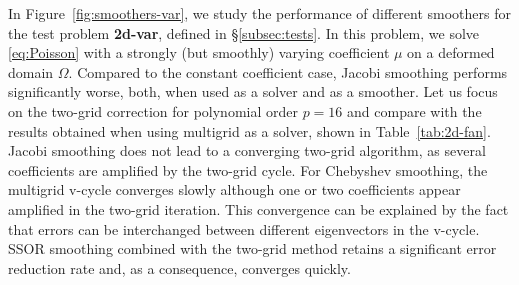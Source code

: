 \documentclass[times]{nlaauth}
\begin{document}
In Figure~\ref{fig:smoothers-var}, we study the performance of
different smoothers for the test problem {\bf 2d-var}, defined in
\S\ref{subsec:tests}. In this problem, we solve
\eqref{eq:Poisson} with a strongly (but smoothly) varying coefficient
$\mu$ on a deformed domain $\Omega$.  Compared to the constant
coefficient case, Jacobi smoothing performs significantly worse, both,
when used as a solver and as a smoother. Let us focus on the two-grid
correction for polynomial order $p=16$ and compare with the results
obtained when using multigrid as a solver, shown in Table~\ref{tab:2d-fan}.
Jacobi smoothing does not lead to a converging two-grid algorithm, as
several coefficients are amplified by the two-grid cycle. For
Chebyshev smoothing, the multigrid v-cycle converges slowly
although one or two coefficients appear amplified in the two-grid
iteration. This convergence can be explained by the fact that errors
can be interchanged between different eigenvectors in the v-cycle.
SSOR smoothing combined with the two-grid method retains a significant
error reduction rate and, as a consequence, converges quickly.
\end{document}
